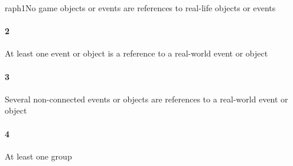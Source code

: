 raph{1}No game objects or events are references to real-life objects or events\paragraph{2}At least one event or object is a reference to a real-world event or object\paragraph{3}Several non-connected events or objects are references to a real-world event or object\paragraph{4}At least one group